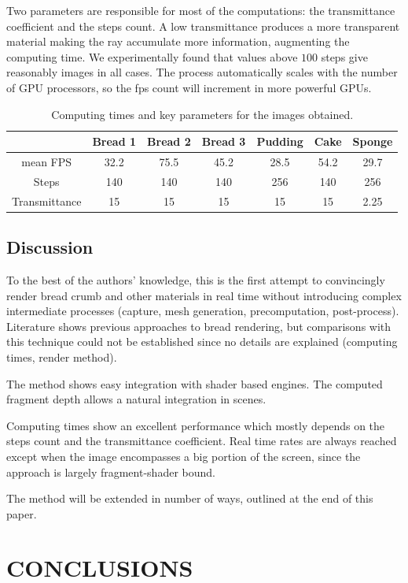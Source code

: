 \documentclass[oneside,a4paper,english,links]{amca}
\begin{document}
Two parameters are responsible for most of the computations: the transmittance coefficient and the steps count. A low transmittance produces a more transparent material making the ray accumulate more information, augmenting the computing time. We experimentally found that values above $100$ steps give reasonably images in all cases. The process automatically scales with the number of GPU processors, so the fps count will increment in more powerful GPUs.

\begin{table}[htb]
\centering
\begin{tabular}{|c|c|c|c|c|c|c|}
\hline &  Bread 1 & Bread 2 & Bread 3 & Pudding & Cake & Sponge \\
\hline
\hline
 mean FPS  & 32.2 &  75.5 &  45.2 & 28.5 &  54.2 & 29.7\\
\hline
 Steps &  140 &  140 &  140 & 256 &  140 & 256 \\
\hline
 Transmittance &  15 &  15 &  15 & 15 &  15 & 2.25 \\
\hline
\end{tabular}
\caption{Computing times and key parameters for the images obtained. }
\label{tab:n1}
\end{table}

\subsection{Discussion}
To the best of the authors' knowledge, this is the first attempt to convincingly render bread crumb and other materials in real time without introducing complex intermediate processes (capture, mesh generation, precomputation, post-process). Literature shows previous approaches to bread rendering\citep{Cho2007}, but comparisons with this technique could not be established since no details are explained (computing times, render method).

The method shows easy integration with shader based engines. The computed fragment depth allows a natural integration in scenes.

Computing times show an excellent performance which mostly depends on
the steps count and the transmittance coefficient. Real
time rates are always reached except when the image encompasses a big portion
of the screen, since the approach is largely fragment-shader bound.

The method will be extended in number of ways, outlined at the end of this paper.


\section{CONCLUSIONS}
\end{document}
